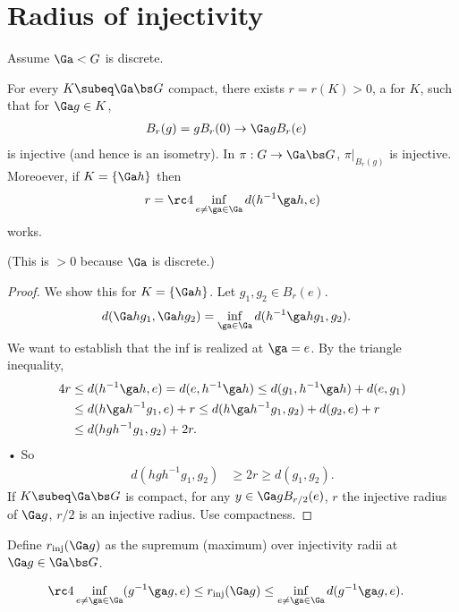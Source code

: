 \section{Radius of injectivity}

Assume $\Ga < G$ is discrete. 
\begin{pr}
For every $K\subeq \Ga \bs G$ compact, there exists $r=r(K)>0$, a  for $K$, such that for $\Ga g\in K$, 
\begin{align}
B_r(g) &= gB_r(0) \to \Ga gB_r(e)
\end{align}
is injective (and hence is an isometry). In $\pi:G\to \Ga \bs G$, $\pi|_{B_r(g)}$ is injective. Moreoever, if $K=\{\Ga h\}$ then 
\begin{align}
r = \rc 4 \inf_{e\ne \ga \in \Ga} d(h^{-1}\ga h,e)
\end{align}
works.
\end{pr}
(This is $>0$ because $\Ga$ is discrete.)
\begin{proof}
We show this for $K=\{\Ga h\}$.  Let $g_1,g_2\in B_r(e)$. 
\begin{align}
d(\Ga hg_1,\Ga hg_2) &=
\inf_{\ga\in \Ga} d(h^{-1}\ga hg_1,g_2).
\end{align}
We want to establish that the inf is realized at $\ga = e$. By the triangle inequality,
\begin{align}
4r &\le d(h^{-1} \ga h, e) = d(e, h^{-1}\ga h) \le d(g_1,h^{-1}\ga h) + d(e,g_1)\\
&\le d(h\ga h^{-1} g_1,e) + r 
\le d(h\ga h^{-1} g_1,g_2) + d(g_2,e) + r\\
&\le d(hgh^{-1} g_1,g_2) + 2r.
\end{align}•
So 
\begin{align}
d(hgh^{-1}g_1, g_2)&\ge 2r \ge d(g_1,g_2).
\end{align}
If $K\subeq \Ga \bs G$ is compact, for any $y\in \Ga gB_{r/2}(e)$, $r$ the injective radius of $\Ga g$, $r/2$ is an injective radius. Use compactness.
\end{proof}
\begin{df}
Define $r_{\text{inj}}(\Ga g)$ as the supremum (maximum) over injectivity radii at $\Ga g\in \Ga \bs G$. 
\end{df}
\begin{align}
\rc 4 \inf_{e\ne \ga \in \Ga} (g^{-1}\ga g,e)
&\le r_{\text{inj}}(\Ga g) \le \inf_{e\ne \ga \in \Ga} d(g^{-1}\ga g,e).
\end{align}
